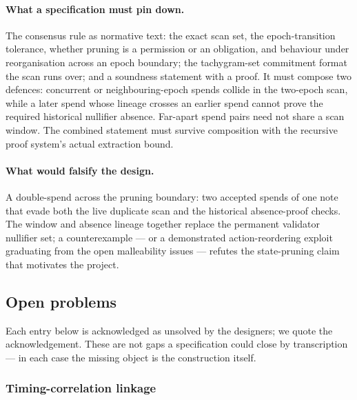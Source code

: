 \documentclass[11pt,a4paper]{article}
\theoremstyle{definition}
\begin{document}
\paragraph{What a specification must pin down.} The consensus rule as
normative text: the exact scan set, the epoch-transition tolerance, whether
pruning is a permission or an obligation, and behaviour under
reorganisation across an epoch boundary; the tachygram-set commitment
format the scan runs over; and a soundness statement with a proof. It
must compose two defences: concurrent or neighbouring-epoch spends
collide in the two-epoch scan, while a later spend whose lineage crosses
an earlier spend cannot prove the required historical nullifier absence.
Far-apart spend pairs need not share a scan window. The combined
statement must survive composition with the recursive proof system's
actual extraction bound.

\paragraph{What would falsify the design.} A double-spend across the
pruning boundary: two accepted spends of one note that evade both the
live duplicate scan and the historical absence-proof checks. The window
and absence lineage together replace the permanent validator nullifier
set; a counterexample --- or a
demonstrated action-reordering exploit graduating from the open malleability
issues --- refutes the state-pruning claim that motivates the project.

\subsection{Open problems}\label{sec:tachyon-open}

Each entry below is acknowledged as unsolved by the designers; we quote the
acknowledgement. These are not gaps a specification could close by
transcription --- in each case the missing object is the construction
itself.

\subsubsection{Timing-correlation linkage}\label{sec:tachyon-open-timing}
\end{document}
